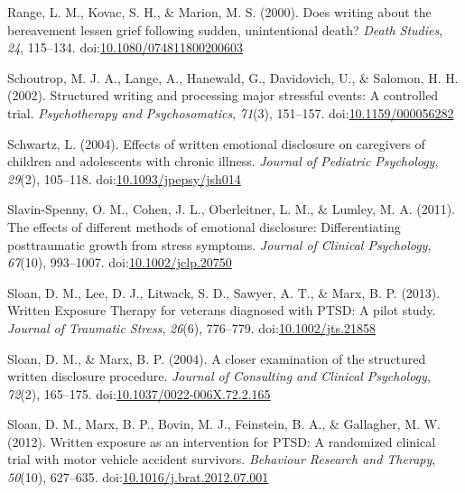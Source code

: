 \documentclass[man]{apa6}
\theoremstyle{definition}
\theoremstyle{definition}
\theoremstyle{definition}
\theoremstyle{remark}
\begin{document}
\leavevmode\hypertarget{ref-Range2000}{}%
Range, L. M., Kovac, S. H., \& Marion, M. S. (2000). Does writing about
the bereavement lessen grief following sudden, unintentional death?
\emph{Death Studies}, \emph{24}, 115--134.
doi:\href{https://doi.org/10.1080/074811800200603}{10.1080/074811800200603}

\leavevmode\hypertarget{ref-Schoutrop2002}{}%
Schoutrop, M. J. A., Lange, A., Hanewald, G., Davidovich, U., \&
Salomon, H. H. (2002). Structured writing and processing major stressful
events: A controlled trial. \emph{Psychotherapy and Psychosomatics},
\emph{71}(3), 151--157.
doi:\href{https://doi.org/10.1159/000056282}{10.1159/000056282}

\leavevmode\hypertarget{ref-Schwartz2004}{}%
Schwartz, L. (2004). Effects of written emotional disclosure on
caregivers of children and adolescents with chronic illness.
\emph{Journal of Pediatric Psychology}, \emph{29}(2), 105--118.
doi:\href{https://doi.org/10.1093/jpepsy/jsh014}{10.1093/jpepsy/jsh014}

\leavevmode\hypertarget{ref-Slavin-Spenny2011}{}%
Slavin-Spenny, O. M., Cohen, J. L., Oberleitner, L. M., \& Lumley, M. A.
(2011). The effects of different methods of emotional disclosure:
Differentiating posttraumatic growth from stress symptoms. \emph{Journal
of Clinical Psychology}, \emph{67}(10), 993--1007.
doi:\href{https://doi.org/10.1002/jclp.20750}{10.1002/jclp.20750}

\leavevmode\hypertarget{ref-Sloan2013}{}%
Sloan, D. M., Lee, D. J., Litwack, S. D., Sawyer, A. T., \& Marx, B. P.
(2013). Written Exposure Therapy for veterans diagnosed with PTSD: A
pilot study. \emph{Journal of Traumatic Stress}, \emph{26}(6), 776--779.
doi:\href{https://doi.org/10.1002/jts.21858}{10.1002/jts.21858}

\leavevmode\hypertarget{ref-Sloan2004}{}%
Sloan, D. M., \& Marx, B. P. (2004). A closer examination of the
structured written disclosure procedure. \emph{Journal of Consulting and
Clinical Psychology}, \emph{72}(2), 165--175.
doi:\href{https://doi.org/10.1037/0022-006X.72.2.165}{10.1037/0022-006X.72.2.165}

\leavevmode\hypertarget{ref-Sloan2012}{}%
Sloan, D. M., Marx, B. P., Bovin, M. J., Feinstein, B. A., \& Gallagher,
M. W. (2012). Written exposure as an intervention for PTSD: A randomized
clinical trial with motor vehicle accident survivors. \emph{Behaviour
Research and Therapy}, \emph{50}(10), 627--635.
doi:\href{https://doi.org/10.1016/j.brat.2012.07.001}{10.1016/j.brat.2012.07.001}
\end{document}
